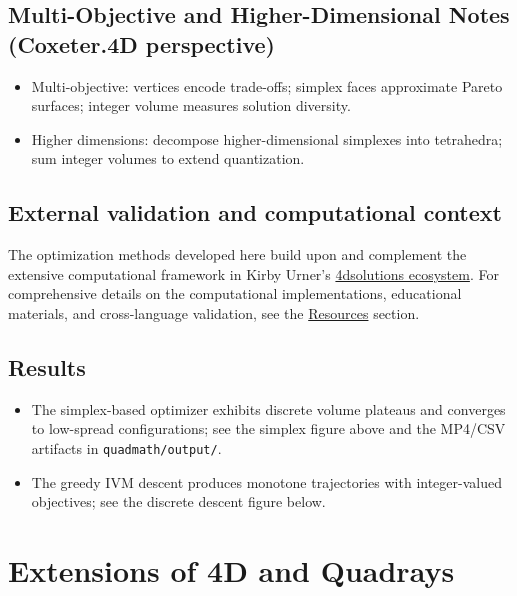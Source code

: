 \documentclass[
  10pt,
]{article}
\newcommand{\passthrough}[1]{#1}
\providecommand{\tightlist}{%
  \setlength{\itemsep}{0pt}\setlength{\parskip}{0pt}}
\begin{document}
\hypertarget{multi-objective-and-higher-dimensional-notes-coxeter.4d-perspective}{%
\subsection{Multi-Objective and Higher-Dimensional Notes (Coxeter.4D
perspective)}\label{multi-objective-and-higher-dimensional-notes-coxeter.4d-perspective}}

\begin{itemize}
\tightlist
\item
  Multi-objective: vertices encode trade-offs; simplex faces approximate
  Pareto surfaces; integer volume measures solution diversity.
\item
  Higher dimensions: decompose higher-dimensional simplexes into
  tetrahedra; sum integer volumes to extend quantization.
\end{itemize}

\hypertarget{external-validation-and-computational-context}{%
\subsection{External validation and computational
context}\label{external-validation-and-computational-context}}

The optimization methods developed here build upon and complement the
extensive computational framework in Kirby Urner's
\href{https://github.com/4dsolutions}{4dsolutions ecosystem}. For
comprehensive details on the computational implementations, educational
materials, and cross-language validation, see the
\href{07_resources.md}{Resources} section.

\hypertarget{results}{%
\subsection{Results}\label{results}}

\begin{itemize}
\tightlist
\item
  The simplex-based optimizer exhibits discrete volume plateaus and
  converges to low-spread configurations; see the simplex figure above
  and the MP4/CSV artifacts in
  \passthrough{\lstinline!quadmath/output/!}.
\item
  The greedy IVM descent produces monotone trajectories with
  integer-valued objectives; see the discrete descent figure below. 
\end{itemize}

\hypertarget{extensions-of-4d-and-quadrays}{%
\section{Extensions of 4D and
Quadrays}\label{extensions-of-4d-and-quadrays}}
\end{document}
